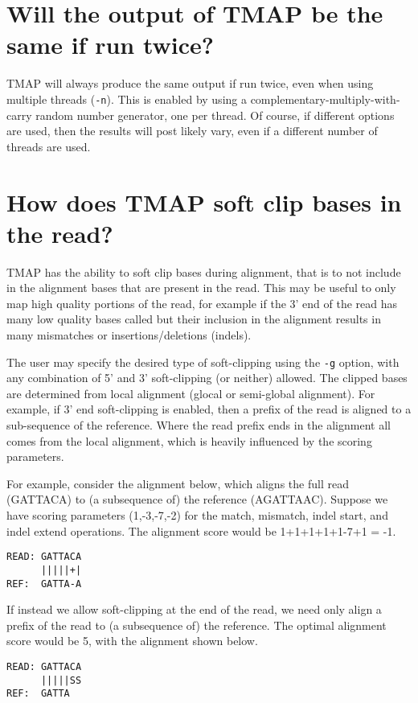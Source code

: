 \documentclass[a4paper,12pt]{book}
\newcommand{\TT}[1]{{\tt #1}} %
\begin{document}
\section{Will the output of TMAP be the same if run twice?}
TMAP will always produce the same output if run twice, even when using multiple threads (\TT{-n}).
This is enabled by using a complementary-multiply-with-carry random number generator, one per thread.
Of course, if different options are used, then the results will post likely vary, even if a different number of threads are used.

\section{How does TMAP soft clip bases in the read?} 
TMAP has the ability to soft clip bases during alignment, that is to not include in the alignment bases that are present in the read.  
This may be useful to only map high quality portions of the read, for example if the 3' end of the read has many low quality bases called but their inclusion in the alignment results in many mismatches or insertions/deletions (indels).

The user may specify the desired type of soft-clipping using the \TT{-g} option, with any combination of 5' and 3' soft-clipping (or neither) allowed. 
The clipped bases are determined from local alignment (glocal or semi-global alignment).  
For example, if 3' end soft-clipping is enabled, then a prefix of the read is aligned to a sub-sequence of the reference.  
Where the read prefix ends in the alignment all comes from the local alignment, which is heavily influenced by the scoring parameters. 

For example, consider the alignment below, which aligns the full read (GATTACA) to (a subsequence of) the reference (AGATTAAC).  
Suppose we have scoring parameters (1,-3,-7,-2) for the match, mismatch, indel start, and indel extend operations.  
The alignment score would be 1+1+1+1+1-7+1 = -1.

\begin{verbatim}
READ: GATTACA
      |||||+|
REF:  GATTA-A
\end{verbatim}

If instead we allow soft-clipping at the end of the read, we need only align a prefix of the read to (a subsequence of) the reference.  
The optimal alignment score would be 5, with the alignment shown below.
\begin{verbatim}
READ: GATTACA
      |||||SS
REF:  GATTA
\end{verbatim}
\end{document}
